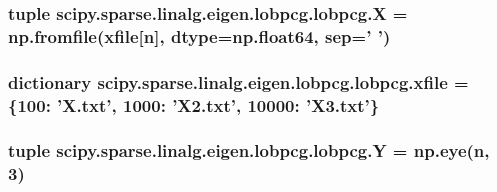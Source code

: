 \subsubsection[{X}]{\setlength{\rightskip}{0pt plus 5cm}tuple scipy.\+sparse.\+linalg.\+eigen.\+lobpcg.\+lobpcg.\+X = np.\+fromfile({\bf xfile}\mbox{[}{\bf n}\mbox{]}, dtype=np.\+float64, sep=' ')}\label{namespacescipy_1_1sparse_1_1linalg_1_1eigen_1_1lobpcg_1_1lobpcg_ae977342f088d4561c1040be0a06e6101}
\hypertarget{namespacescipy_1_1sparse_1_1linalg_1_1eigen_1_1lobpcg_1_1lobpcg_a5d9fbf72b57f59bf652026c4675543c9}{}
\subsubsection[{xfile}]{\setlength{\rightskip}{0pt plus 5cm}dictionary scipy.\+sparse.\+linalg.\+eigen.\+lobpcg.\+lobpcg.\+xfile = \{100\+: 'X.\+txt', 1000\+: 'X2.\+txt', 10000\+: 'X3.\+txt'\}}\label{namespacescipy_1_1sparse_1_1linalg_1_1eigen_1_1lobpcg_1_1lobpcg_a5d9fbf72b57f59bf652026c4675543c9}
\hypertarget{namespacescipy_1_1sparse_1_1linalg_1_1eigen_1_1lobpcg_1_1lobpcg_a3ba7d3d4a3ef2d2a2ac6011b3a298bae}{}
\subsubsection[{Y}]{\setlength{\rightskip}{0pt plus 5cm}tuple scipy.\+sparse.\+linalg.\+eigen.\+lobpcg.\+lobpcg.\+Y = np.\+eye({\bf n}, 3)}\label{namespacescipy_1_1sparse_1_1linalg_1_1eigen_1_1lobpcg_1_1lobpcg_a3ba7d3d4a3ef2d2a2ac6011b3a298bae}
